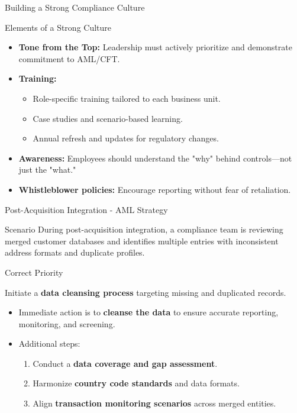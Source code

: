 \documentclass{beamer}
\begin{document}
	\begin{frame}{Building a Strong Compliance Culture}
		\begin{block}{Elements of a Strong Culture}
			\begin{itemize}
				\item \textbf{Tone from the Top:} Leadership must actively prioritize and demonstrate commitment to AML/CFT.
				\item \textbf{Training:}
				\begin{itemize}
					\item Role-specific training tailored to each business unit.
					\item Case studies and scenario-based learning.
					\item Annual refresh and updates for regulatory changes.
				\end{itemize}
				\item \textbf{Awareness:} Employees should understand the "why" behind controls—not just the "what."
				\item \textbf{Whistleblower policies:} Encourage reporting without fear of retaliation.
			\end{itemize}
		\end{block}
	\end{frame}
	
	\begin{frame}{Post-Acquisition Integration - AML Strategy}
		\begin{block}{Scenario}
			During post-acquisition integration, a compliance team is reviewing merged customer databases and identifies multiple entries with inconsistent address formats and duplicate profiles.
		\end{block}
		\begin{block}{Correct Priority}
			\begin{center}
				Initiate a \textbf{data cleansing process} targeting missing and duplicated records.
			\end{center}
		\end{block}
		\begin{itemize}
			\item Immediate action is to \textbf{cleanse the data} to ensure accurate reporting, monitoring, and screening.
			\item Additional steps:
			\begin{enumerate}
				\item Conduct a \textbf{data coverage and gap assessment}.
				\item Harmonize \textbf{country code standards} and data formats.
				\item Align \textbf{transaction monitoring scenarios} across merged entities.
			\end{enumerate}
		\end{itemize}
	\end{frame}
	
\end{document}
